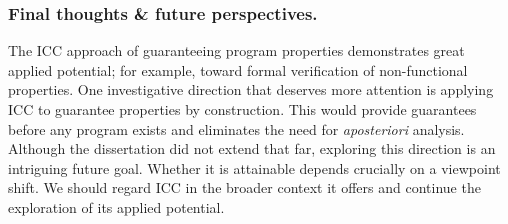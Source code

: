 \subsubsection*{Final thoughts \& future perspectives.}
The ICC approach of guaranteeing program properties demonstrates great applied potential;
for example, toward formal verification of non-functional properties.
One investigative direction that deserves more attention is applying ICC to guarantee properties by construction.
This would provide guarantees before any program exists and eliminates the need for \emph{aposteriori} analysis.
Although the dissertation did not extend that far, exploring this direction is an intriguing future goal.
Whether it is attainable depends crucially on a viewpoint shift.
We should regard ICC in the broader context it offers and continue the exploration of its applied potential.
